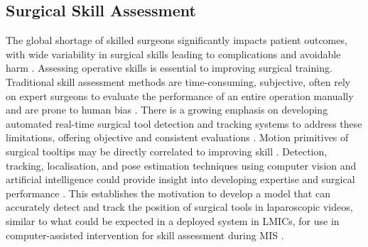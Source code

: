 
\subsection{Surgical Skill Assessment}

The global shortage of skilled surgeons significantly impacts patient outcomes, with wide variability in surgical skills leading to complications and avoidable harm \cite{jin_tool_2018}. Assessing operative skills is essential to improving surgical training. Traditional skill assessment methods are time-consuming, subjective, often rely on expert surgeons to evaluate the performance of an entire operation manually and are prone to human bias \cite{vassiliou_global_2005, paley_crowdsourced_2021, levin_automated_2019}. There is a growing emphasis on developing automated real-time surgical tool detection and tracking systems to address these limitations, offering objective and consistent evaluations \cite{loza_realtime_2024}. Motion primitives of surgical tooltips may be directly correlated to improving skill \cite{retrosi_motion_2015}. Detection, tracking, localisation, and pose estimation techniques using computer vision and artificial intelligence could provide insight into developing expertise and surgical performance \cite{bodenstedt_comparative_2018, allan_toward_2013, constable_enhancing_2024}. This establishes the motivation to develop a model that can accurately detect and track the position of surgical tools in laparoscopic videos, similar to what could be expected in a deployed system in LMICs, for use in computer-assisted intervention for skill assessment during MIS \cite{nwoye_cholectrack20_2023}. 

